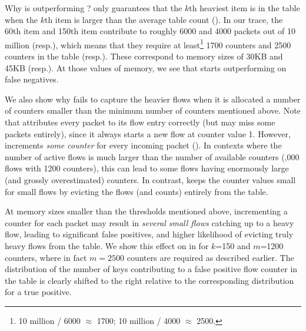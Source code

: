 Why is \TheSystem outperforming \spacesaving? \Spacesaving only guarantees that
the $k$th heaviest item is in the table when the $k$th item is larger than the
average table count (). In our trace, the 60th item and
150th item contribute to roughly 6000 and 4000 packets out of 10 million
(resp.), which means that they require at least\footnote{10 million / 6000
  $\approx$ 1700; 10 million / 4000 $\approx$ 2500.} 1700 counters and 2500
counters in the table (resp.). These correspond to memory sizes of 30KB and 45KB
(resp.). At those values of memory, we see that \spacesaving starts
outperforming \TheSystem on false negatives.

We also show why \spacesaving fails to capture the heavier flows when it is
allocated a number of counters smaller than the minimum number of counters
mentioned above. Note that \TheSystem attributes every packet to its flow entry
correctly (but may miss some packets entirely), since it always starts a new
flow at counter value 1. However, \spacesaving increments {\em some counter} for
every incoming packet (). In contexts where the number of
active flows is much larger than the number of available counters (,000
flows with 1200 counters), this can lead to some flows having enormously large
(and grossly overestimated) counters. In contrast, \TheSystem keeps the counter
values small for small flows by evicting the flows (and counts) entirely from
the table.

At memory sizes smaller than the thresholds mentioned above, incrementing a
counter for each packet may result in {\em several small flows} catching up to a
heavy flow, leading to significant false positives, and higher likelihood of
evicting truly heavy flows from the table. We show this effect on \spacesaving
in  for $k$=150 and $m$=1200 counters, where 
in fact $m=2500$ counters are required as described earlier.
%
The distribution of the number of keys contributing to a false positive flow
counter in the table is clearly shifted to the right relative to the
corresponding distribution for a true positive.
%


